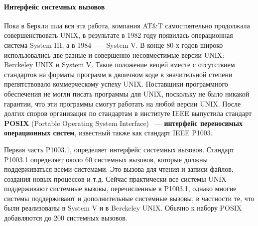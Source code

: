 \documentclass[10pt]{article}
\begin{document}
	\paragraph{Интерфейс системных вызовов}
	Пока в Беркли шла вся эта работа, компания AT\&T самостоятельно продолжала совершенствовать UNIX, в результате в 1982 году появилась операционная система System III, а в 1984 ~--- System V. В конце 80-х годов широко использовались две разные и совершенно несовместимые версии UNIX: Berckeley UNIX и System V. Такое положение вещей вместе с отсутствием стандартов на форматы программ в двоичном коде в значительной степени препятствовало коммерческому успеху UNIX. Поставщики программного обеспечения не могли писать программы для UNIX, поскольку не было никакой гарантии, что эти программы смогут работать на любой версии UNIX. После долгих споров организация по стандартам в институте IEEE выпустила стандарт \textbf{POSIX} (Portable Operating System Interface) ~--- \textbf{интерфейс переносимых операционных систем}, известный также как стандарт IEEE P1003.

	Первая часть P1003.1, определяет интерфейс системных вызовов. Стандарт P1003.1 определяет около 60 системных вызовов, которые должны поддерживаться всеми системами. Это вызова для чтения и записи файлов, создания новых процессов и т.д. Сейчас практически все системы UNIX поддерживают системные вызовы, перечисленные в P1003.1, однако многие системы поддерживают и дополнительные системные вызовы, в частности те, что были реализованы в System V и в Berckeley UNIX. Обычно к набору POSIX добавляются до 200 системных вызовов.
\end{document}
